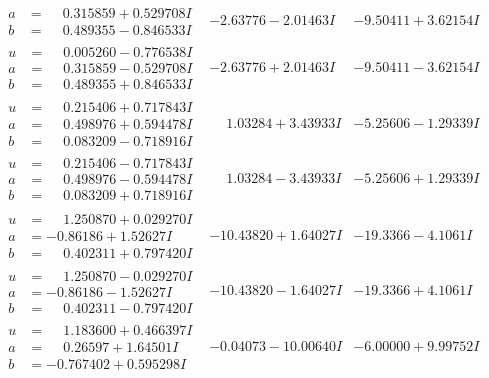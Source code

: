 \documentclass[1p]{elsarticle_modified}
\theoremstyle{definition}
\begin{document}
$$\begin{array}{c|c|c}
\begin{aligned}
a &= \phantom{-}0.315859 + 0.529708 I \\
b &= \phantom{-}0.489355 - 0.846533 I\end{aligned}
 & -2.63776 - 2.01463 I & -9.50411 + 3.62154 I \\ \hline\begin{aligned}
u &= \phantom{-}0.005260 - 0.776538 I \\
a &= \phantom{-}0.315859 - 0.529708 I \\
b &= \phantom{-}0.489355 + 0.846533 I\end{aligned}
 & -2.63776 + 2.01463 I & -9.50411 - 3.62154 I \\ \hline\begin{aligned}
u &= \phantom{-}0.215406 + 0.717843 I \\
a &= \phantom{-}0.498976 + 0.594478 I \\
b &= \phantom{-}0.083209 - 0.718916 I\end{aligned}
 & \phantom{-}1.03284 + 3.43933 I & -5.25606 - 1.29339 I \\ \hline\begin{aligned}
u &= \phantom{-}0.215406 - 0.717843 I \\
a &= \phantom{-}0.498976 - 0.594478 I \\
b &= \phantom{-}0.083209 + 0.718916 I\end{aligned}
 & \phantom{-}1.03284 - 3.43933 I & -5.25606 + 1.29339 I \\ \hline\begin{aligned}
u &= \phantom{-}1.250870 + 0.029270 I \\
a &= -0.86186 + 1.52627 I \\
b &= \phantom{-}0.402311 + 0.797420 I\end{aligned}
 & -10.43820 + 1.64027 I & -19.3366 - 4.1061 I \\ \hline\begin{aligned}
u &= \phantom{-}1.250870 - 0.029270 I \\
a &= -0.86186 - 1.52627 I \\
b &= \phantom{-}0.402311 - 0.797420 I\end{aligned}
 & -10.43820 - 1.64027 I & -19.3366 + 4.1061 I \\ \hline\begin{aligned}
u &= \phantom{-}1.183600 + 0.466397 I \\
a &= \phantom{-}0.26597 + 1.64501 I \\
b &= -0.767402 + 0.595298 I\end{aligned}
 & -0.04073 - 10.00640 I & -6.00000 + 9.99752 I \\ \hline\begin{aligned}

\end{aligned}
\end{array}$$
\end{document}
